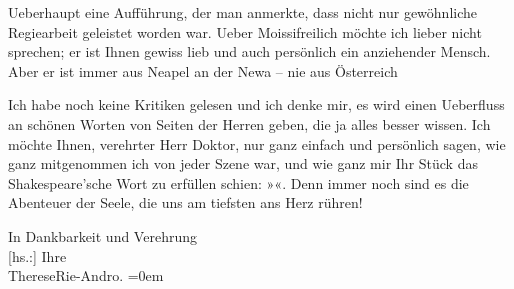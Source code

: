 \pstart
           Ueberhaupt eine Aufführung, der man anmerkte, dass nicht nur gewöhnliche Regiearbeit
               geleistet worden war. Ueber Moissifreilich möchte ich lieber nicht
               sprechen; er ist Ihnen gewiss lieb und auch persönlich ein anziehender Mensch. Aber
               er ist immer aus Neapel an der Newa – nie aus Österreich\pend
           
\pstart
           Ich habe noch keine Kritiken gelesen und ich denke mir, es wird einen Ueberfluss an
               schönen Worten von Seiten der Herren geben, die ja alles besser wissen. Ich möchte
               Ihnen, verehrter Herr Doktor, nur ganz einfach und persönlich sagen, wie ganz
               mitgenommen ich von jeder Szene war, und wie ganz mir Ihr Stück das Shakespeare’sche Wort zu erfüllen schien: »\label{K_L02567-2v}\label{K_L02567-2}«. Denn immer noch sind es die Abenteuer der Seele, die uns am tiefsten ans
               Herz rühren!\pend
           
\pstart
           In Dankbarkeit und Verehrung{\\[\baselineskip]}{[}hs.:{]} Ihre{\\[\baselineskip]}\spacefill\mbox{ThereseRie-Andro.}\pend
           \leftskip=0em{}\endnumbering{}  
      